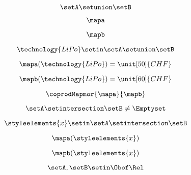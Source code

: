 {\begin{forslides}
    \begin{equation}
        \label{eq:combination-108}
        \setA\setunion \setB
    \end{equation}

    \begin{equation}
        \label{eq:combination-109}
        \mapa
    \end{equation}

    \begin{equation}
        \label{eq:combination-110}
        \mapb
    \end{equation}

    \begin{equation}
        \label{eq:combination-111}
        \technology{LiPo}\setin \setA\setunion \setB
    \end{equation}

    \begin{equation}
        \label{eq:combination-112}
        \mapa(\technology{LiPo})=\unit[50]{CHF}
    \end{equation}

    \begin{equation}
        \label{eq:combination-113}
        \mapb(\technology{LiPo})=\unit[60]{CHF}
    \end{equation}

    \begin{equation}
        \label{eq:combination-114}
        \coprodMapmor{\mapa}{\mapb}
    \end{equation}

    \begin{equation}
        \label{eq:combination-115}
        \setA\setintersection \setB\neq \Emptyset
    \end{equation}

    \begin{equation}
        \label{eq:combination-116}
        \styleelements{x}\setin \setA\setintersection \setB
    \end{equation}

    \begin{equation}
        \label{eq:combination-117}
        \mapa(\styleelements{x})
    \end{equation}

    \begin{equation}
        \label{eq:combination-118}
        \mapb(\styleelements{x})
    \end{equation}

    \begin{equation}
        \label{eq:combination-119}
        \setA,\setB\setin \Obof\Rel
    \end{equation}


\end{forslides}}
